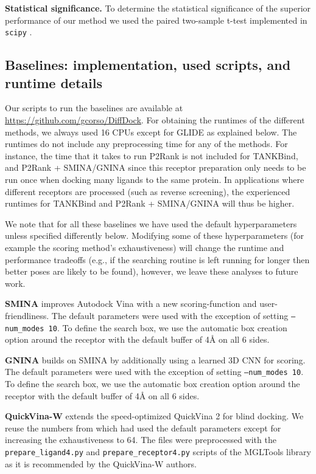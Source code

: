 \documentclass{article} \usepackage{iclr2023_conference,times}
\newcommand{\new}[1]{#1}
\begin{document}
\textbf{Statistical significance.} To determine the statistical significance of the superior performance of our method we used the paired two-sample t-test implemented in \texttt{scipy} \citep{2020SciPy-NMeth}. 

\subsection{Baselines: implementation, used scripts, and runtime details} \label{appx:baseline_details}
Our scripts to run the baselines are available at \url{https://github.com/gcorso/DiffDock}. For obtaining the runtimes of the different methods, we always used 16 CPUs except for GLIDE as explained below. The runtimes do not include any preprocessing time for any of the methods. For instance, the time that it takes to run P2Rank is not included for TANKBind, and P2Rank + SMINA/GNINA since this receptor preparation only needs to be run once when docking many ligands to the same protein. In applications where different receptors  are processed (such as reverse screening), the experienced runtimes for TANKBind and P2Rank + SMINA/GNINA will thus be higher.

We note that for all these baselines we have used the default hyperparameters unless specified differently below. Modifying some of these hyperparameters (for example the scoring method's exhaustiveness) will change the runtime and performance tradeoffs (e.g., if the searching routine is left running for longer then better poses are likely to be found), however, we leave these analyses to future work.

\textbf{SMINA} \citep{koes2013smina} improves Autodock Vina with a new scoring-function and user-friendliness. The default parameters were used with the exception of setting \texttt{--num\_modes 10}. To define the search box, we use the automatic box creation option around the receptor with the default buffer of 4\AA{} on all 6 sides.

\textbf{GNINA} \citep{mcnutt2021gnina} builds on SMINA by additionally using a learned 3D CNN for scoring. The default parameters were used with the exception of setting \texttt{--num\_modes 10}. To define the search box, we use the automatic box creation option around the receptor with the default buffer of 4\AA{} on all 6 sides.


\textbf{QuickVina-W} \citep{Hassan2017QVinaW} extends the speed-optimized QuickVina 2 \citep{Alhossary2015QuickVina2} for blind docking. We reuse the numbers from \citet{equibind} which had used the default parameters except for increasing the exhaustiveness to 64. \new{The files were preprocessed with the \texttt{prepare\_ligand4.py} and \texttt{prepare\_receptor4.py} scripts of the MGLTools library as it is recommended by the QuickVina-W authors.}
\end{document}
